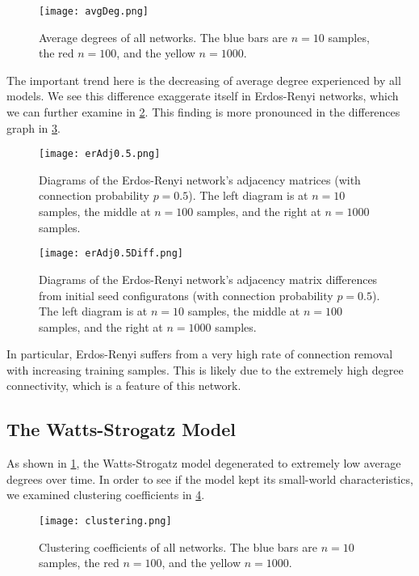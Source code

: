 \begin{figure}[h]
    \centering
    \texttt{[image: avgDeg.png]}
    \caption{
        Average degrees of all networks. The blue bars are $n=10$ samples, the
        red $n=100$, and the yellow $n=1000$.
    }
    \label{fig:avgDeg}
\end{figure}

The important trend here is the decreasing of average degree experienced by all
models. We see this difference exaggerate itself in Erdos-Renyi networks, which
we can further examine in \ref{fig:erAdj0.5}. This finding is more pronounced
in the differences graph in \ref{fig:erAdj0.5Diff}.

\begin{figure}[h]
    \centering
    \texttt{[image: erAdj0.5.png]}
    \caption{
        Diagrams of the Erdos-Renyi network's adjacency matrices (with
        connection probability $p=0.5$). The left diagram is at $n=10$ samples,
        the middle at $n=100$ samples, and the right at $n=1000$ samples.
    }
    \label{fig:erAdj0.5}
\end{figure}

\begin{figure}[h]
    \centering
    \texttt{[image: erAdj0.5Diff.png]}
    \caption{
        Diagrams of the Erdos-Renyi network's adjacency matrix differences from
        initial seed configuratons (with connection probability $p=0.5$). The
        left diagram is at $n=10$ samples, the middle at $n=100$ samples, and
        the right at $n=1000$ samples.
    }
    \label{fig:erAdj0.5Diff}
\end{figure}

In particular, Erdos-Renyi suffers from a very high rate of connection removal
with increasing training samples. This is likely due to the extremely high
degree connectivity, which is a feature of this network.

\subsection{The Watts-Strogatz Model}

As shown in \ref{fig:avgDeg}, the Watts-Strogatz model degenerated to extremely
low average degrees over time. In order to see if the model kept its small-world
characteristics, we examined clustering coefficients in \ref{fig:clustering}.

\begin{figure}[h]
    \centering
    \texttt{[image: clustering.png]}
    \caption{
        Clustering coefficients of all networks. The blue bars are $n=10$
        samples, the red $n=100$, and the yellow $n=1000$.
    }
    \label{fig:clustering}
\end{figure}

